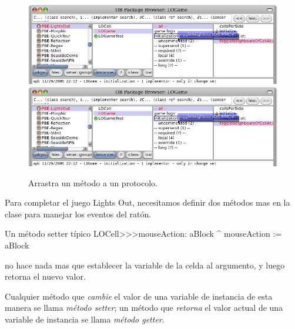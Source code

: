 \documentclass[a4paper,10pt,twoside]{book}
\begin{document}
{\begin{figure}[htbp]
   \centering
   \ifluluelse
		{\includegraphics[width=\textwidth]{DragMethod} }
		{\includegraphics[scale=0.7]{DragMethod} }
   \caption{Arrastra un m\'etodo a un protocolo.}
\end{figure}

Para completar el juego Lights Out, necesitamos definir dos m\'etodos mas en la clase  para manejar los eventos del rat\'on.
\begin{method}[mouseAction:]{Un m\'etodo setter t\'ipico}
LOCell>>>mouseAction: aBlock
   ^ mouseAction := aBlock
\end{method}

 no hace nada mas que establecer la variable  de la celda al argumento, y luego retorna el nuevo valor.

Cualquier m\'etodo que \emph{cambie} el valor de una variable de instancia de esta manera se llama \emph{m\'etodo setter}; un m\'etodo que \emph{retorna} el valor actual de una variable de instancia se llama \emph{m\'etodo getter}.

}
\end{document}
